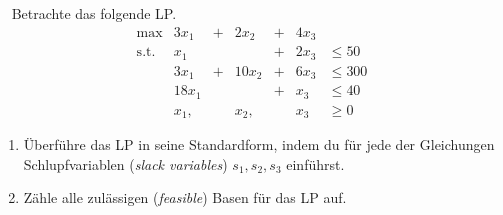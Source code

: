 \documentclass{uebung_cs}
\begin{document}
\begin{aufgabe}[Standardform]\
	Betrachte das folgende \acs{LP}.
	\[
		\begin{array}{rrrllll}
			\text{max}    & 3x_1 		    & + & 2 x_2	& +  & 4x_3  &\\
			\text{s.t.}	&  x_1		    & 	&		& +	 & 2x_3  & \le 50 \\
								& 3x_1 		    & + & 10x_2	& +	 & 6x_3	 & \le 300\\
								& 18 x_1 	    &   &       & +  & x_3 	 & \le 40\\ 
								& x_1,      	&	& x_2,	&	 & x_3	 &\geq 0 
		\end{array}
	\]
	\begin{enumerate}
		\item Überführe das \acs{LP} in seine Standardform, indem du für jede der Gleichungen Schlupfvariablen (\textit{slack variables}) $s_1,s_2,s_3$ einführst.
		\item Zähle alle zulässigen (\emph{feasible}) Basen für das \acs{LP} auf.
	\end{enumerate}
\end{aufgabe}
\end{document}
